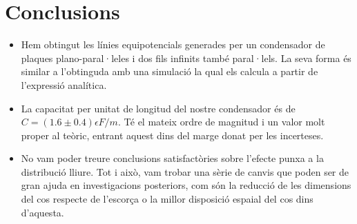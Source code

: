 \section{Conclusions}
\begin{itemize}
	\item Hem obtingut les línies equipotencials generades per un condensador de plaques plano-paral·leles i dos fils infinits també paral·lels. La seva forma és similar a l'obtinguda amb una simulació la qual els calcula a partir de l'expressió analítica.
	\item La capacitat per unitat de longitud del nostre condensador és de $C=(1.6\pm0.4)\epsilon F/m$. Té el mateix ordre de magnitud i un valor molt proper al teòric, entrant aquest dins del marge donat per les incerteses.
	\item No vam poder treure conclusions satisfactòries sobre l'efecte punxa a la distribució lliure. Tot i això, vam trobar una sèrie de canvis que poden ser de gran ajuda en investigacions posteriors, com són la reducció de les dimensions del cos respecte de l'escorça o la millor disposició espaial del cos dins d'aquesta.
\end{itemize}
